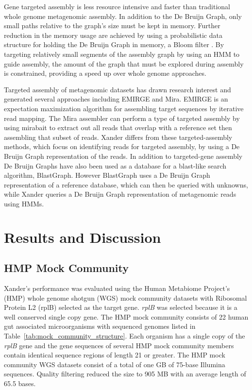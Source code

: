 \documentclass[10pt]{bmc_article}
\newenvironment{bmcformat}{\begin{raggedright}\baselineskip20pt\sloppy\setboolean{publ}{false}}{\end{raggedright}\baselineskip20pt\sloppy}
\begin{document}
\begin{bmcformat}
Gene targeted assembly is less resource intensive and faster than traditional whole genome metagenomic assembly.  In addition to the De Bruijn Graph, only small paths relative to the graph's size must be kept in memory.  Further reduction in the memory usage are achieved by using a probabilistic data structure for holding the De Bruijn Graph in memory, a Bloom filter \cite{bloom_space/time_1970,pell_scaling_2012}.  By targeting relatively small segments of the assembly graph by using an HMM to guide assembly, the amount of the graph that must be explored during assembly is constrained, providing a speed up over whole genome approaches.

Targeted assembly of metagenomic datasets has drawn research interest and generated several approaches including EMIRGE\cite{miller_emirge:_2011} and Mira\cite{chevreux_using_2004}. EMIRGE is an expectation maximization algorithm for assembling target sequences by iterative read mapping.  The Mira assembler can perform a type of targeted assembly by using mirabait to extract out all reads that overlap with a reference set then assembling that subset of reads. Xander differs from these targeted-assembly methods, which focus on identifying reads for targeted assembly, by using a De Bruijn Graph representation of the reads.   In addition to targeted-gene assembly De Bruijn Graphs have also been used as a database for a blast-like search algorithm, BlastGraph\cite{holley_blastgraph:_2012}. However BlastGraph uses a De Bruijn Graph representation of a reference database, which can then be queried with unknowns, while Xander queries a De Bruijn Graph representation of metagenomic reads using HMMs.
\section*{Results and Discussion}
\subsection*{HMP Mock Community}
Xander's performance was evaluated using the Human Metabiome Project's (HMP) whole genome shotgun (WGS) mock community datasets with Ribosomal Protein L2 (rplB) selected as the target gene.  \emph{rplB} was selected because it is a well conserved single copy gene. The HMP mock community consists of 22 human gut associated microorganisms with sequenced genomes listed in Table~\ref{tab:mock_community_structure}.  Each organism has a single copy of the \emph{rplB} gene and the gene sequences of several HMP mock community members contain identical sequence regions of length 21 or greater. The HMP mock community WGS datasets consist of a total of one GB of 75-base Illumina sequences. Quality filtering reduced the size to 905 MB with an average length of 65.5 bases.


\end{bmcformat}
\end{document}
